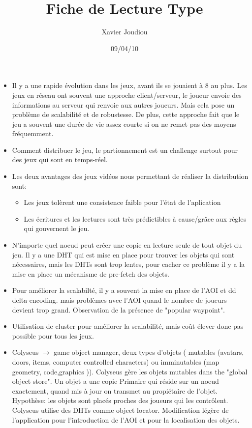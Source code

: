 \documentclass[11pt,a4paper]{article}
\title{Fiche de Lecture Type}
\author{Xavier Joudiou}
\date{09/04/10}
\begin{document}
	
  \begin{itemize}
  \renewcommand{\labelitemi}{$\Rightarrow$}
	\item Il y a une rapide évolution dans les jeux, avant ils se jouaient à 8 au plus. Les jeux en réseau ont souvent une approche client/serveur, le joueur envoie des informations au serveur qui renvoie aux autres joueurs. Mais cela pose un problème de scalabilité et de robustesse. De plus, cette approche fait que le jeu a souvent une durée de vie assez courte si on ne remet pas des moyens fréquemment.
	\item Comment distribuer le jeu, le partionnement est un challenge surtout pour des jeux qui sont en temps-réel.
	\item Les deux avantages des jeux vidéos nous permettant de réaliser la distribution sont:
	\begin{itemize}
		\item Les jeux tolèrent une consistence faible pour l'état de l'aplication
		\item Les écritures et les lectures sont très prédictibles à cause/grâce aux règles qui gouvernent le jeu.
	\end{itemize}
	\item N'importe quel noeud peut créer une copie en lecture seule de tout objet du jeu. Il y a une DHT qui est mise en place pour trouver les objets qui sont nécessaires, mais les DHTs sont trop lentes, pour cacher ce problème il y a la mise en place un mécanisme de pre-fetch des objets. 
	\item Pour améliorer la scalabilté, il y a souvent la mise en place de l'AOI et dd delta-encoding. mais problèmes avec l'AOI quand le nombre de joueurs devient trop grand. Observation de la présence de "popular waypoint".
	\item Utilisation de cluster pour améliorer la scalabilité, mais coût élever donc pas possible pour tous les jeux.
	\item Colyseus $\rightarrow$ game object manager, deux types d'objets ( mutables (avatars, doors, items, computer controlled characters) ou imminutables (map geometry, code,graphics  )). Colyseus gère les objets mutables dans the "global object store". Un objet a une copie Primaire qui réside sur un noeud exactement, quand mis à jour on transmet au propiétaire de l'objet. Hypothèse: les objets sont placés proches des joueurs qui les contrôlent. Colyseus utilise des DHTs comme object locator. Modification légère de l'application pour l'introduction de l'AOI et pour la localisation des objets.

\end{itemize}
\end{document}
